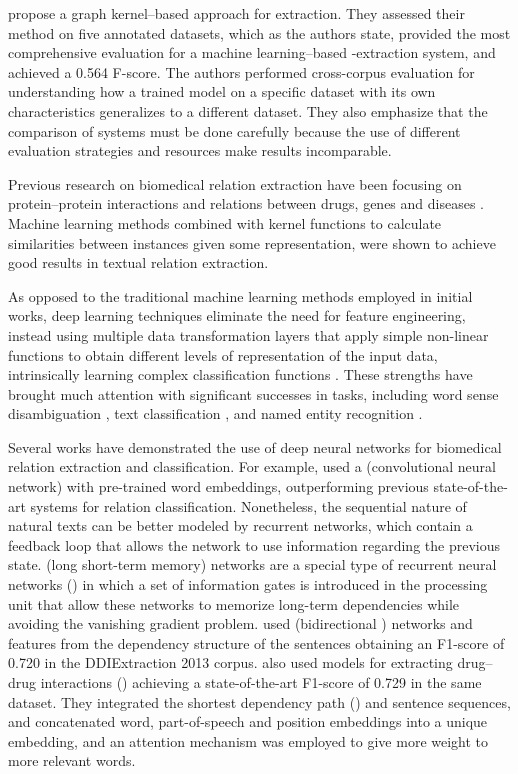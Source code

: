 \textcite{airola2008a} propose a graph kernel--based approach for  extraction.
They assessed their method on five  annotated datasets, which as the authors state, provided the most comprehensive evaluation for a machine learning--based -extraction system, and achieved a 0.564 F-score.
The authors performed cross-corpus evaluation for understanding how a trained model on a specific dataset with its own characteristics generalizes to a different dataset.
They also emphasize that the comparison of  systems must be done carefully because the use of different evaluation strategies and resources make results incomparable.

Previous research on biomedical relation extraction have been focusing on protein--protein interactions \parencite{krallinger2011a} and relations between drugs, genes and diseases \parencite{frijters2010a,krallinger2017b}.
Machine learning methods combined with kernel functions to calculate similarities between instances given some representation, were shown to achieve good results in textual relation extraction.

As opposed to the traditional machine learning methods employed in initial works, deep learning techniques eliminate the need for feature engineering, instead using multiple data transformation layers that apply simple non-linear functions to obtain different levels of representation of the input data, intrinsically learning complex classification functions \parencite{lecun2015a}.
These strengths have brought much attention with significant successes in  tasks, including word sense disambiguation \parencite{jimenoyepes2017a}, text classification \parencite{kim2014a,kowsari2017a}, and named entity recognition \parencite{habibi2017a,lyu2017a}.

Several works have demonstrated the use of deep neural networks for biomedical relation extraction and classification.
For example, \textcite{nguyen2015a} used a  (convolutional neural network) with pre-trained word embeddings, outperforming previous state-of-the-art systems for relation classification.
Nonetheless, the sequential nature of natural texts can be better modeled by recurrent networks, which contain a feedback loop that allows the network to use information regarding the previous state.
 (long short-term memory) networks are a special type of recurrent neural networks () in which a set of information gates is introduced in the processing unit that allow these networks to memorize long-term dependencies while avoiding the vanishing gradient problem.
\textcite{wang2017a} used  (bidirectional ) networks and features from the dependency structure of the sentences obtaining an F1-score of 0.720 in the DDIExtraction 2013 corpus.
\textcite{zhang2017a} also used  models for extracting drug--drug interactions () achieving a state-of-the-art F1-score of 0.729 in the same dataset.
They integrated the shortest dependency path () and sentence sequences, and concatenated word, part-of-speech and position embeddings into a unique embedding, and an attention mechanism was employed to give more weight to more relevant words.

